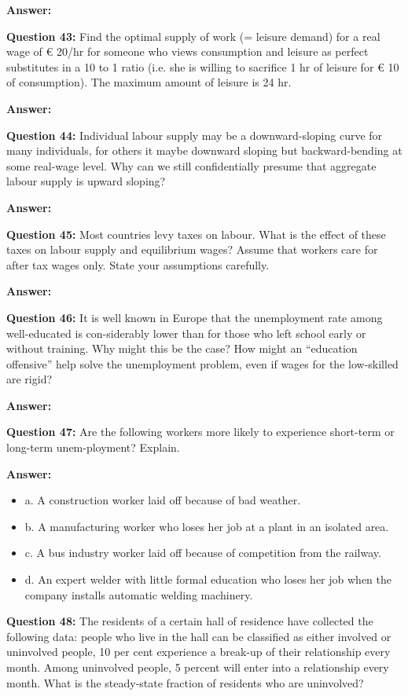 \documentclass[a4paper, 11pt]{article}
\begin{document}
\textbf{Answer:}

\textbf{Question 43:} Find the optimal supply of work (= leisure demand) for a real wage of € 20/hr for someone who views consumption and leisure as perfect substitutes in a 10 to 1 ratio (i.e. she is willing to sacrifice 1 hr of leisure for € 10 of consumption). The maximum amount of leisure is 24 hr.

\textbf{Answer:}

\textbf{Question 44:} Individual labour supply may be a downward-sloping curve for many individuals, for others it maybe downward sloping but backward-bending at some real-wage level. Why can we still confidentially presume that aggregate labour supply is upward sloping?

\textbf{Answer:}

\textbf{Question 45:} Most countries levy taxes on labour. What is the effect of these taxes on labour supply and equilibrium wages? Assume that workers care for after tax wages only. State your assumptions carefully.

\textbf{Answer:}

\textbf{Question 46:} It is well known in Europe that the unemployment rate among well-educated is con-siderably lower than for those who left school early or without training. Why might this be the case? How might an “education offensive” help solve the unemployment problem, even if wages for the low-skilled are rigid?

\textbf{Answer:}

\textbf{Question 47:} Are the following workers more likely to experience short-term or long-term unem-ployment? Explain.

\textbf{Answer:}
\begin{itemize}
\item a. A construction worker laid off because of bad weather.
\item b. A manufacturing worker who loses her job at a plant in an isolated area.
\item c. A bus industry worker laid off because of competition from the railway.
\item d. An expert welder with little formal education who loses her job when the company installs automatic welding machinery.

\end{itemize}

\textbf{Question 48:} The residents of a certain hall of residence have collected the following data: people who live in the hall can be classified as either involved or uninvolved people, 10 per cent experience a break-up of their relationship every month. Among uninvolved people, 5 percent will enter into a relationship every month. What is the steady-state fraction of residents who are uninvolved?
\end{document}

